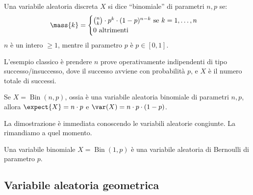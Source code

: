 \begin{defn}
Una variabile aleatoria discreta $X$ si dice ``binomiale'' di parametri $n, p$ se:
\[
\mass{k} =
\begin{cases}
\binom{n}{k} \cdot p^k \cdot (1 - p)^{n - k} \text{ se } k = 1, \dots, n \\
0 \text{ altrimenti}
\end{cases}
\]
$n$ \`e un intero $\ge 1$, mentre il parametro $p$ \`e $p \in [0,1]$.
\end{defn}
L'esempio classico \`e prendere $n$ prove operativamente indipendenti di tipo successo/insuccesso, dove il successo avviene con probabilit\`a $p$, e $X$ \`e il numero totale di successi.
\begin{prop}
Se $X = \operatorname{Bin}(n,p)$, ossia \`e una variabile aleatoria binomiale di parametri $n,p$, allora $\expect{X} = n \cdot p$ e $\var (X) = n \cdot p \cdot (1 - p)$.
\end{prop}
La dimostrazione \`e immediata conoscendo le variabili aleatorie congiunte. La rimandiamo a quel momento.

\begin{oss}
Una variabile binomiale $X = \operatorname{Bin}(1,p)$ \`e una variabile aleatoria di Bernoulli di parametro $p$.
\end{oss}

\subsection{Variabile aleatoria geometrica}

